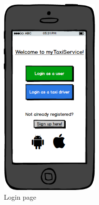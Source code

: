 \begin{figure}[H]
    \centering
    \includegraphics[width=5cm]{./Mockups/Login.png}
    \caption{Login page}
\end{figure}